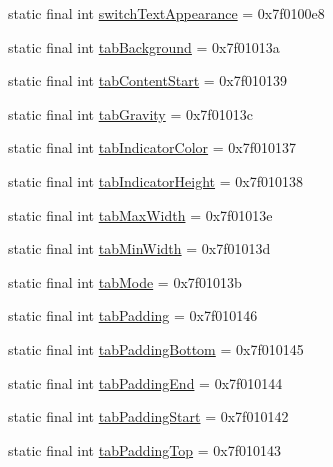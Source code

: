 \begin{CompactItemize}
static final int \hyperlink{classandroid_1_1support_1_1v7_1_1mediarouter_1_1_r_1_1attr_46bd5d222736fa57f299d3c261acc437}{switchTextAppearance} = 0x7f0100e8
\item 
static final int \hyperlink{classandroid_1_1support_1_1v7_1_1mediarouter_1_1_r_1_1attr_af826de51f9110daa04c2c60a140d614}{tabBackground} = 0x7f01013a
\item 
static final int \hyperlink{classandroid_1_1support_1_1v7_1_1mediarouter_1_1_r_1_1attr_b8a25c559e86b244184cfd5f0140d284}{tabContentStart} = 0x7f010139
\item 
static final int \hyperlink{classandroid_1_1support_1_1v7_1_1mediarouter_1_1_r_1_1attr_f84f0f8095731dee0845e05f6c368f41}{tabGravity} = 0x7f01013c
\item 
static final int \hyperlink{classandroid_1_1support_1_1v7_1_1mediarouter_1_1_r_1_1attr_e8fe8f68376a3bc1a1f83cec3797a9f2}{tabIndicatorColor} = 0x7f010137
\item 
static final int \hyperlink{classandroid_1_1support_1_1v7_1_1mediarouter_1_1_r_1_1attr_7ff7fc43f7671b10f1c0e1b38d77ada9}{tabIndicatorHeight} = 0x7f010138
\item 
static final int \hyperlink{classandroid_1_1support_1_1v7_1_1mediarouter_1_1_r_1_1attr_46a7d64455d33d4df2a226f5e25fefca}{tabMaxWidth} = 0x7f01013e
\item 
static final int \hyperlink{classandroid_1_1support_1_1v7_1_1mediarouter_1_1_r_1_1attr_720b1be87147d8da957c7c9081780da1}{tabMinWidth} = 0x7f01013d
\item 
static final int \hyperlink{classandroid_1_1support_1_1v7_1_1mediarouter_1_1_r_1_1attr_a46cd6625d323102f8b4d9e7fd8b9cc7}{tabMode} = 0x7f01013b
\item 
static final int \hyperlink{classandroid_1_1support_1_1v7_1_1mediarouter_1_1_r_1_1attr_6b034b92e1860e7d6b61c61d101f13e0}{tabPadding} = 0x7f010146
\item 
static final int \hyperlink{classandroid_1_1support_1_1v7_1_1mediarouter_1_1_r_1_1attr_271b365b5cbd75a7ea57fdac51b8576c}{tabPaddingBottom} = 0x7f010145
\item 
static final int \hyperlink{classandroid_1_1support_1_1v7_1_1mediarouter_1_1_r_1_1attr_1f064924cb6afc302c3dee72ad7ef4fe}{tabPaddingEnd} = 0x7f010144
\item 
static final int \hyperlink{classandroid_1_1support_1_1v7_1_1mediarouter_1_1_r_1_1attr_6ffc81c072c870a642da3b9c72742e76}{tabPaddingStart} = 0x7f010142
\item 
static final int \hyperlink{classandroid_1_1support_1_1v7_1_1mediarouter_1_1_r_1_1attr_306b8efff22bcaadd30e727df30db94f}{tabPaddingTop} = 0x7f010143

\end{CompactItemize}
